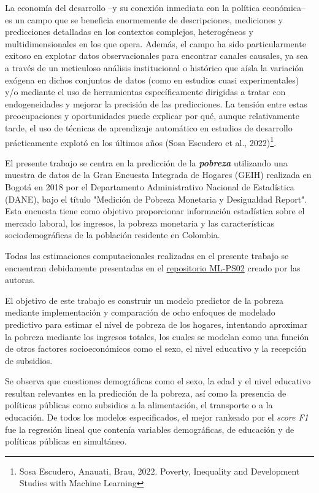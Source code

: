 \documentclass[11pt, a4paper]{article}
\begin{document}
La economía del desarrollo –y su conexión inmediata con la política económica– es un campo que se beneficia enormemente de descripciones, mediciones y predicciones detalladas en los contextos complejos, heterogéneos y multidimensionales
en los que opera. Además, el campo ha sido particularmente exitoso  en explotar datos observacionales para encontrar canales causales, ya sea a través de un meticuloso análisis institucional o histórico que aísla la variación exógena en dichos conjuntos de datos (como en estudios cuasi experimentales) y/o mediante el uso de herramientas específicamente dirigidas a tratar con endogeneidades y mejorar la precisión de las predicciones. La tensión entre estas preocupaciones y oportunidades puede explicar por qué, aunque relativamente tarde, el uso de técnicas de aprendizaje automático en estudios de desarrollo prácticamente explotó en los últimos años (Sosa Escudero et al., 2022)\footnote{Sosa Escudero, Anauati, Brau, 2022. Poverty, Inequality and Development Studies with Machine Learning}.

El presente trabajo se centra en la predicción de la \textbf{\textit{pobreza}} utilizando una muestra de datos de la Gran Encuesta Integrada de Hogares (GEIH) realizada en Bogotá en 2018 por el Departamento Administrativo Nacional de Estadística (DANE), bajo el título "Medición de Pobreza Monetaria y Desigualdad Report". Esta encuesta tiene como objetivo proporcionar información estadística sobre el mercado laboral, los ingresos, la pobreza monetaria y las características sociodemográficas de la población residente en Colombia.

Todas las estimaciones computacionales realizadas en el presente trabajo se encuentran debidamente presentadas en el \href{https://github.com/Dalila02/ML_PS02}{repositorio ML-PS02} creado por las autoras.

El objetivo de este trabajo es construir un modelo predictor de la pobreza mediante implementación y comparación de ocho enfoques de modelado predictivo para estimar el nivel de pobreza de los hogares, intentando aproximar la pobreza mediante los ingresos totales, los cuales se modelan como una función de otros factores socioeconómicos como el sexo, el nivel educativo y la recepción de subsidios. 

Se observa que cuestiones demográficas como el sexo, la edad y el nivel educativo resultan relevantes en la predicción de la pobreza, así como la presencia de políticas públicas como subsidios a la alimentación, el transporte o a la educación. De todos los modelos especificados, el mejor rankeado por el \textit{score F1} fue la regresión lineal que contenía variables demográficas, de educación y de políticas públicas en simultáneo.
\end{document}
